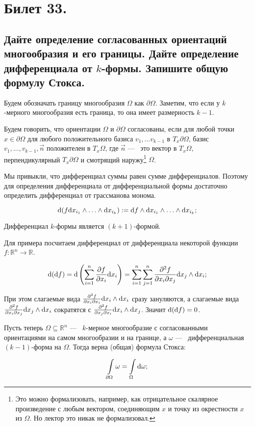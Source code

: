 \section{Билет 33.}

\subsection{Дайте определение согласованных ориентаций многообразия и его границы. Дайте определение дифференциала от $k$-формы. Запишите общую формулу Стокса.}
Будем обозначать границу многообразия $\Omega$ как $\partial \Omega$. Заметим, что если у $k$-мерного многообразия есть граница, то она имеет размерность $k - 1$.

\begin{definition}
    Будем говорить, что ориентации $\Omega$ и $\partial \Omega$ согласованы, если для любой точки $x \in \partial \Omega$ для любого положительного базиса $v_1, \ldots v_{k - 1}$ в $T_x \partial \Omega$, базис $v_1, \ldots, v_{k - 1}, \vec{n}$ положителен в $T_x \Omega$, где $\vec{n}$ ---~ это вектор в $T_x \Omega$, перпендикулярный $T_x \partial \Omega$ и смотрящий наружу\footnote{Это можно формализовать, например, как отрицательное скалярное произведение с любым вектором, соединяющим $x$ и точку из окрестности $x$ из $\Omega$. Но лектор это никак не формализовал.} $\Omega$.
\end{definition}

Мы привыкли, что дифференциал суммы равен сумме дифференциалов. Поэтому для определения дифференциала от дифференциальной формы достаточно определить дифференциал от грассманова монома.

\[ \mathrm{d}(f \mathrm{d} x_{i_1} \land \ldots \land \mathrm{d} x_{i_k}) := \mathrm{d} f \land \mathrm{d} x_{i_1} \land \ldots \land \mathrm{d} x_{i_k}; \]

\begin{remark}
    Дифференциал $k$-формы является $(k + 1)$-формой.
\end{remark}

Для примера посчитаем дифференциал от дифференциала некоторой функции $f:\mathbb{R}^n \to \mathbb{R}$.

\[\mathrm{d} (\mathrm{d} f) = \mathrm{d} \left(\sum_{i = 1}^n \frac{\partial f}{\partial x_i}\mathrm{d} x_i \right) = \sum_{i = 1}^n \sum_{j = 1}^n \frac{\partial^2 f}{\partial x_i \partial x_j} \mathrm{d} x_j \land \mathrm{d} x_i; \]

При этом слагаемые вида $\frac{\partial^2 f}{\partial x_i \partial x_i} \mathrm{d} x_i \land \mathrm{d} x_i$ сразу зануляются, а слагаемые вида $\frac{\partial^2 f}{\partial x_i \partial x_j} \mathrm{d} x_j \land \mathrm{d} x_i$ сократятся с $\frac{\partial^2 f}{\partial x_j \partial x_i} \mathrm{d} x_i \land \mathrm{d} x_j$. Значит $\mathrm{d}(\mathrm{d} f) = 0$.

Пусть теперь $\Omega \subseteq \mathbb{R}^n$ ---~ $k$-мерное многообразие с согласованными ориентациями на самом многообразии и на границе, а $\omega$ ---~ дифференциальная $(k - 1)$-форма на $\Omega$. Тогда верна (общая) формула Стокса:

\[ \int\limits_{\partial \Omega} \omega = \int\limits_\Omega \mathrm{d} \omega; \] 